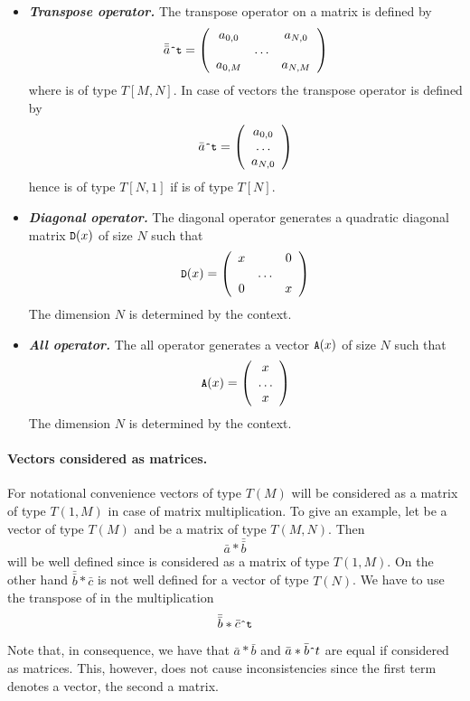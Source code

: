 \begin{itemize}
\item \textbf{\textit{Transpose operator.}} The transpose operator  on a matrix  is defined by
%
\[\bar{\bar{a}}\texttt{\small{\^{}t}} =
\left(
\begin{array}{ccc}
a_{0,0}  &   &  a_{N,0} \\
 &  \ldots &  \\
a_{0,M}  &  &  a_{N,M} 
\end{array}
\right)
\]
%
where  is of type $T[M,N]$. In case of vectors the transpose operator
 is defined by
%
\[\bar{a}\texttt{\small{\^{}t}} =
\left(
\begin{array}{c}
a_{0,0} \\
\ldots \\
a_{N,0} 
\end{array}
\right)
\]
%
hence  is of type $T[N,1]$ if  is of type $T[N]$.

\item \textbf{\textit{Diagonal operator.}} The diagonal operator  generates a quadratic diagonal matrix $\texttt{\small{D}}(x)$ of size $N$ such that
%
\[\texttt{\small{D}}(x) =
\left(
\begin{array}{ccc}
x  &   &  0 \\
 &  \ldots &  \\
0  &  &  x 
\end{array}
\right)
\]
%
The dimension $N$ is determined by the context.

\item \textbf{\textit{All operator.}} The all operator  generates a vector $\texttt{\small{A}}(x)$ of size $N$ such that
%
\[\texttt{\small{A}}(x) =
\left(
\begin{array}{c}
x\\
\ldots\\
x 
\end{array}
\right)
\]
%
The dimension $N$ is determined by the context.

\end{itemize}


\paragraph{Vectors considered as matrices.} For notational convenience vectors  
of type $T(M)$ will be considered as a matrix of type $T(1,M)$ in case of matrix
multiplication. To give an example, let  be a vector of type $T(M)$ and 
be a matrix of type $T(M,N)$. Then $$\bar{a} * \bar{\bar{b}}$$ will be well
defined since  is considered as a matrix of type $T(1,M)$. On the other hand
$\bar{\bar{b}} * \bar{c}$ is not well defined for a vector  of type $T(N)$.
We have to use the transpose of  in the multiplication $$\bar{\bar{b}} * \bar{c}\texttt{\small{\^{}t}}$$
Note that, in consequence, we have that $\bar{a} * \bar{b}$ and  $\bar{a} * \bar{b}\texttt{\small{\^{}}}t$ are equal if considered as matrices.
This, however, does not cause inconsistencies since the first term denotes a vector, the second a matrix. 



